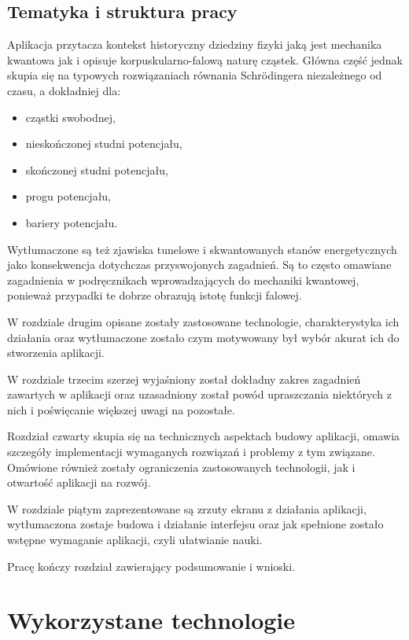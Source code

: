 \documentclass{SGGW-thesis}
\begin{document}
	\section{Tematyka i struktura pracy}
	Aplikacja przytacza kontekst historyczny dziedziny fizyki jaką jest mechanika kwantowa jak i opisuje korpuskularno-falową naturę cząstek. Główna część jednak skupia się na typowych rozwiązaniach równania Schrödingera niezależnego od czasu, a dokładniej dla:
	\begin{itemize}
	\item cząstki swobodnej,
	\item nieskończonej studni potencjału,
	\item skończonej studni potencjału,
	\item progu potencjału,
	\item bariery potencjału.
	\end{itemize}
	
	Wytłumaczone są też zjawiska tunelowe i skwantowanych stanów energetycznych jako konsekwencja dotychczas przyswojonych zagadnień. Są to często omawiane zagadnienia w podręcznikach wprowadzających do mechaniki kwantowej\cite{fiz atom}\cite{mechanika kwant}\cite{fiz kwant}, ponieważ przypadki te dobrze obrazują istotę funkcji falowej.
	
	W rozdziale drugim opisane zostały zastosowane technologie, charakterystyka ich działania oraz wytłumaczone zostało czym motywowany był wybór akurat ich do stworzenia aplikacji.
	
	W rozdziale trzecim szerzej wyjaśniony został dokładny zakres zagadnień zawartych w aplikacji oraz uzasadniony został powód upraszczania niektórych z nich i poświęcanie większej uwagi na pozostałe.
	
	Rozdział czwarty skupia się na technicznych aspektach budowy aplikacji, omawia szczegóły implementacji wymaganych rozwiązań i problemy z tym związane. Omówione również zostały ograniczenia zastosowanych technologii, jak i otwartość aplikacji na rozwój.
	
	W rozdziale piątym zaprezentowane są zrzuty ekranu z działania aplikacji, wytłumaczona zostaje budowa i działanie interfejsu oraz jak spełnione zostało wstępne wymaganie aplikacji, czyli ułatwianie nauki.
	
	Pracę kończy rozdział zawierający podsumowanie i wnioski.
	
	
\chapter{Wykorzystane technologie}
\end{document}
